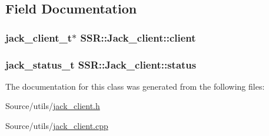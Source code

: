 \subsection{Field Documentation}
\hypertarget{classSSR_1_1Jack__client_ac8e23397794574f1066ee78c69c08f58}{
\subsubsection[{client}]{\setlength{\rightskip}{0pt plus 5cm}jack\-\_\-client\-\_\-t$\ast$ S\-S\-R\-::\-Jack\-\_\-client\-::client\hspace{0.3cm}{\ttfamily [private]}}}\label{classSSR_1_1Jack__client_ac8e23397794574f1066ee78c69c08f58}
\hypertarget{classSSR_1_1Jack__client_a0e34088a4eaa840399ce372195ee9839}{
\subsubsection[{status}]{\setlength{\rightskip}{0pt plus 5cm}jack\-\_\-status\-\_\-t S\-S\-R\-::\-Jack\-\_\-client\-::status\hspace{0.3cm}{\ttfamily [private]}}}\label{classSSR_1_1Jack__client_a0e34088a4eaa840399ce372195ee9839}


The documentation for this class was generated from the following files\-:\begin{DoxyCompactItemize}
\item 
Source/utils/\hyperlink{jack__client_8h}{jack\-\_\-client.\-h}\item 
Source/utils/\hyperlink{jack__client_8cpp}{jack\-\_\-client.\-cpp}\end{DoxyCompactItemize}
